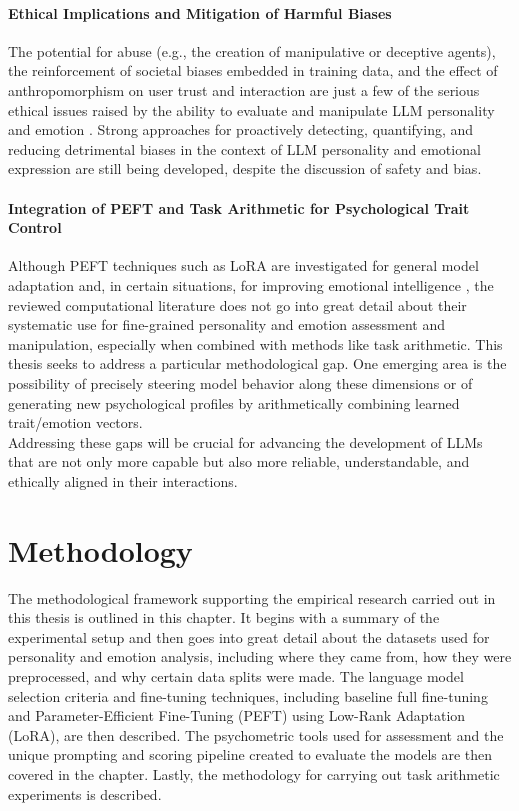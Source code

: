 \documentclass{DESSThesis}
\begin{document}
\subsubsection{Ethical Implications and Mitigation of Harmful Biases}
The potential for abuse (e.g., the creation of manipulative or deceptive agents), the reinforcement of societal biases embedded in training data, and the effect of anthropomorphism on user trust and interaction are just a few of the serious ethical issues raised by the ability to evaluate and manipulate LLM personality and emotion \cite{chang_language_2023,safdari_personality_2023,chang_modeling_2024}. Strong approaches for proactively detecting, quantifying, and reducing detrimental biases in the context of LLM personality and emotional expression are still being developed, despite the discussion of safety and bias.

\subsubsection{Integration of PEFT and Task Arithmetic for Psychological Trait Control}
Although PEFT techniques such as LoRA are investigated for general model adaptation and, in certain situations, for improving emotional intelligence \cite{zhao_both_2024}, the reviewed computational literature does not go into great detail about their systematic use for fine-grained personality and emotion assessment and manipulation, especially when combined with methods like task arithmetic. This thesis seeks to address a particular methodological gap. One emerging area is the possibility of precisely steering model behavior along these dimensions or of generating new psychological profiles by arithmetically combining learned trait/emotion vectors.
\\
Addressing these gaps will be crucial for advancing the development of LLMs that are not only more capable but also more reliable, understandable, and ethically aligned in their interactions.

\chapter{Methodology}
\thispagestyle{empty}
The methodological framework supporting the empirical research carried out in this thesis is outlined in this chapter. It begins with a summary of the experimental setup and then goes into great detail about the datasets used for personality and emotion analysis, including where they came from, how they were preprocessed, and why certain data splits were made. The language model selection criteria and fine-tuning techniques, including baseline full fine-tuning and Parameter-Efficient Fine-Tuning (PEFT) using Low-Rank Adaptation (LoRA), are then described. The psychometric tools used for assessment and the unique prompting and scoring pipeline created to evaluate the models are then covered in the chapter. Lastly, the methodology for carrying out task arithmetic experiments is described.
\end{document}
